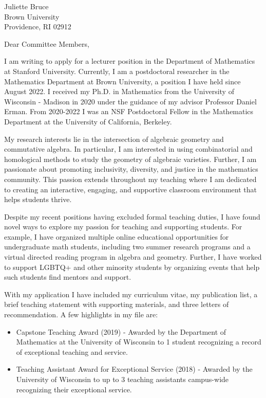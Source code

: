 \documentclass[11pt]{brownletter}
\date{April 5, 2024} %
\begin{document}
\begin{letter}{Juliette Bruce\\ 
               Brown University\\ 
               Providence, RI 02912}

\opening{Dear Committee Members,}

I am writing to apply for a lecturer position in the Department of Mathematics at Stanford University. Currently, I am a postdoctoral researcher in the Mathematics Department at Brown University, a position I have held since August 2022. I received my Ph.D. in Mathematics from the University of Wisconsin - Madison in 2020 under the guidance of my advisor Professor Daniel Erman. From 2020-2022 I was an NSF Postdoctoral Fellow in the Mathematics Department at the University of California, Berkeley.



My research interests lie in the intersection of algebraic geometry and commutative algebra. In particular, I am interested in using combinatorial and homological methods to study the geometry of algebraic varieties. Further, I am passionate about promoting inclusivity, diversity, and justice in the mathematics community. This passion extends throughout my teaching where I am dedicated to creating an interactive, engaging, and supportive classroom environment that helps students thrive. 

Despite my recent positions having excluded formal teaching duties, I have found novel ways to explore my passion for teaching and supporting students. For example, I have organized multiple online educational opportunities for undergraduate math students, including two summer research programs and a virtual directed reading program in algebra and geometry. Further, I have worked to support LGBTQ+ and other minority students by organizing events that help such students find mentors and support.  

With my application I have included my curriculum vitae, my publication list, a brief teaching statement with supporting materials, and three letters of recommendation. A few highlights in my file are:
\begin{itemize}

\item Capstone Teaching Award (2019) - Awarded by the Department of Mathematics at the University of Wisconsin to 1 student recognizing a record of exceptional teaching and service.
\item Teaching Assistant Award for Exceptional Service  (2018) - Awarded by the University of Wisconsin to up to 3 teaching assistants campus-wide recognizing their exceptional service.


\end{itemize}
\end{letter}
\end{document}
